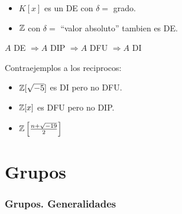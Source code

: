 \begin{example}
	\begin{itemize}
		\item \(K[x ]\) es un DE con \(\delta = \) grado.
		\item \(\mathbb{Z}\) con \(\delta = \) ``valor absoluto'' tambien es DE.
	\end{itemize}
\end{example}
\begin{theorem}
	\(A \) DE \(\Rightarrow A \) DIP \(\Rightarrow A \) DFU \(\Rightarrow A \text{ DI }\)
\end{theorem}
\begin{example}
	Contraejemplos a los reciprocos:
	\begin{itemize}
		\item \(\mathbb{Z}[\sqrt{-5} ]\) es DI pero no DFU.
		\item \(\mathbb{Z}[x ]\) es DFU pero no DIP.
		\item \(\mathbb{Z} \left [ \frac{n + \sqrt{-19} }{2} \right ]\)
	\end{itemize}
\end{example}

\part{Grupos}
\section{Grupos. Generalidades}
